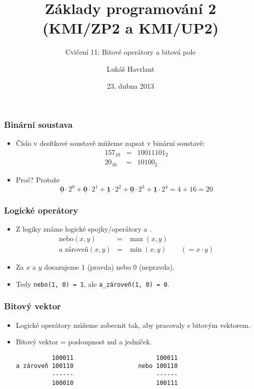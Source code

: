 \documentclass{beamer}
\title{Základy programování 2 (KMI/ZP2 a KMI/UP2)}
\subtitle{Cvičení 11: Bitové operátory a bitová pole}
\author{Lukáš Havrlant}
\date{23. dubna 2013}
\institute{Univerzita Palackého}
\newenvironment{itemizex}%
  {\large \begin{itemize}%
    \setlength{\itemsep}{8pt}%
    \setlength{\parskip}{8pt}}%
  {\end{itemize}}
\begin{document}
\begin{frame}[t,plain]
\titlepage
\end{frame}


\begin{frame}[t,fragile]\frametitle{Binární soustava} 
    \begin{itemizex}
        \item Číslo v desítkové soustavě můžeme zapsat v binární soustavě:
\begin{eqnarray*}
157_{10} &=& 10011101_2\\
20_{10} &=& 10100_2
\end{eqnarray*}
        \item Proč? Protože
$$
\underline{\textbf{0}}\cdot 2^0 + \underline{\textbf{0}}\cdot 2^1 + \underline{\textbf{1}}\cdot 2^2 + \underline{\textbf{0}}\cdot 2^3 + \underline{\textbf{1}}\cdot 2^4 = 4 + 16 = 20
$$
    \end{itemizex}
\end{frame}


\begin{frame}[t,fragile]\frametitle{Logické operátory} 
    \begin{itemizex}
        \item Z logiky známe logické spojky/operátory  a . 
\begin{eqnarray*}
\mbox{nebo}(x, y) &=&  \max(x, y)\\
\mbox{a zároveň}(x, y) &=&  \min(x, y)\qquad (= x \cdot y)
\end{eqnarray*}
        \item Za $x$ a $y$ dosazujeme 1 (pravda) nebo 0 (nepravda).
        \item Tedy \texttt{nebo(1, 0) = 1}, ale \texttt{a\_zároveň(1, 0) = 0}.
    \end{itemizex}
\end{frame}

\begin{frame}[t,fragile]\frametitle{Bitový vektor} 
    \begin{itemizex}
        \item Logické operátory můžeme zobecnit tak, aby pracovaly s bitovým vektorem.
        \item Bitový vektor = posloupnost nul a jedniček.
\begin{verbatim}
          100011                       100011
a zároveň 100110                  nebo 100110
          ------                       ------
          100010                       100111
\end{verbatim}
    \end{itemizex}
\end{frame}
\end{document}
